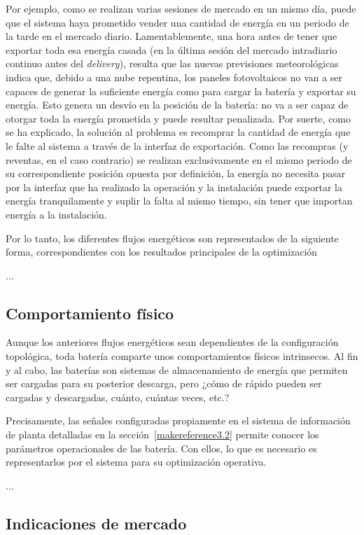 Por ejemplo, como se realizan varias sesiones de mercado en un mismo día, puede que el sistema haya prometido vender una cantidad de energía en un periodo de la tarde en el mercado diario. Lamentablemente, una hora antes de tener que exportar toda esa energía casada (en la última sesión del mercado intradiario continuo antes del \textit{delivery}), resulta que las nuevas previsiones meteorológicas indica que, debido a una nube repentina, los paneles fotovoltaicos no van a ser capaces de generar la suficiente energía como para cargar la batería y exportar su energía. Esto genera un desvío en la posición de la batería: no va a ser capaz de otorgar toda la energía prometida y puede resultar penalizada. Por suerte, como se ha explicado, la solución al problema es recomprar la cantidad de energía que le falte al sistema a través de la interfaz de exportación. Como las recompras (y reventas, en el caso contrario) se realizan exclusivamente en el mismo periodo de su correspondiente posición opuesta por definición, la energía no necesita pasar por la interfaz que ha realizado la operación y la instalación puede exportar la energía tranquilamente y suplir la falta al mismo tiempo, sin tener que importan energía a la instalación.

Por lo tanto, los diferentes flujos energéticos son representados de la siguiente forma, correspondientes con los resultados principales de la optimización

...

\subsection{Comportamiento físico}
\label{makereference5.1.3}

Aunque los anteriores flujos energéticos sean dependientes de la configuración topológica, toda batería comparte unos comportamientos físicos intrinsecos. Al fin y al cabo, las baterías son sistemas de almacenamiento de energía que permiten ser cargadas para su posterior descarga, pero ¿cómo de rápido pueden ser cargadas y descargadas, cuánto, cuántas veces, etc.?

Precisamente, las señales configuradas propiamente en el sistema de información de planta detalladas en la sección~\ref{makereference3.2} permite conocer los parámetros operacionales de las batería. Con ellos, lo que es necesario es representarlos por el sistema para su optimización operativa.

...

\subsection{Indicaciones de mercado}
\label{makereference5.1.4}

